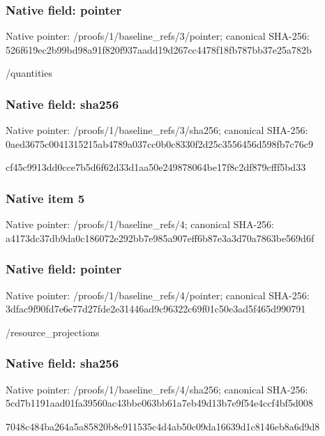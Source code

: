 \documentclass[10pt,a4paper]{article}
\begin{document}
\subsubsection{Native field: pointer}
Native pointer: /proofs/1/baseline\_\allowbreak{}refs/3/pointer; canonical SHA-256: 526f619ec2b99bd98a91f820f937aadd19d267cc4478f18fb787bb37e25a782b

\begingroup\raggedright\sloppy /\allowbreak{}quantities\par\endgroup

\subsubsection{Native field: sha256}
Native pointer: /proofs/1/baseline\_\allowbreak{}refs/3/sha256; canonical SHA-256: 0aed3675c0041315215ab4789a037cc0b0c8330f2d25c3556456d598fb7c76c9

\begingroup\raggedright\sloppy cf45c9913dd0cce7b5d6f62d33d1aa50e249878064be17f8c2df879cfff5bd33\par\endgroup

\subsubsection{Native item 5}
Native pointer: /proofs/1/baseline\_\allowbreak{}refs/4; canonical SHA-256: a4173dc37db9da0c186072e292bb7e985a907eff6b87e3a3d70a7863be569d6f

\subsubsection{Native field: pointer}
Native pointer: /proofs/1/baseline\_\allowbreak{}refs/4/pointer; canonical SHA-256: 3dfac9f90fd7e6e77d27fde2e31446ad9c96322c69f01c50e3ad5f465d990791

\begingroup\raggedright\sloppy /\allowbreak{}resource\_\allowbreak{}projections\par\endgroup

\subsubsection{Native field: sha256}
Native pointer: /proofs/1/baseline\_\allowbreak{}refs/4/sha256; canonical SHA-256: 5cd7b1191aad01fa39560ac43bbe063bb61a7eb49d13b7e9f54e4ccf4bf5d008

\begingroup\raggedright\sloppy 7048c484ba264a5a85820b8e911535c4d4ab50c09da16639d1c8146eb8a6d9d8\par\endgroup
\end{document}
